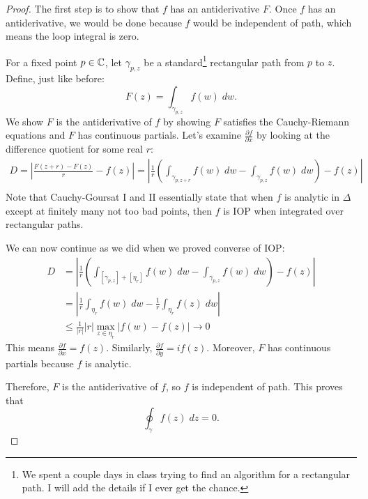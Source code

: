 \documentclass[notes]{subfile}
\begin{document}
\begin{proof}
    The first step is to show that $f$ has an antiderivative $F$.
    Once $f$ has an antiderivative, we would be done
    because $f$ would be independent of path, which means
    the loop integral is zero.

    \noindent
    For a fixed point $p \in \operatorname{\mathbb{C}}$, let $\gamma_{p, z}$ be a standard\footnote{We spent a couple days in class trying to
        find an algorithm for a rectangular path.
        I will add the details if I ever get the chance.
    }
    rectangular path from $p$ to $z$. 
    Define, just like before:
    \[ F(z) = \int_{\gamma_{p, z}} f(w) \; dw .\]
    We show $F$ is the antiderivative of $f$ by showing
    $F$ satisfies the Cauchy-Riemann equations and $F$ 
    has continuous partials.
    Let's examine $\frac{\partial f}{\partial x}$ by 
    looking at the difference quotient for some real $r$:
    \begin{align*}
        D = 
        \left| \frac{F(z+r) - F(z)}{r} - f(z)\right| =
        \left| \frac{1}{r}\left( \int_{\gamma_{p, z+r}} f(w) \; dw - 
        \int_{\gamma_{p, z}} f(w) \; dw \right)  - f(z) \right| \\
    \end{align*}
    Note that Cauchy-Goursat I and II essentially state that
    when $f$ is analytic in $\Delta$ except at finitely many
    not too bad points, then $f$ is IOP when integrated
    over rectangular paths.

    \noindent
    We can now continue as we did when we proved converse of IOP:
    \begin{align*}
        D &= \left| \frac{1}{r}\left( \int_{[\gamma_{p, z}] + [\eta_r]} f(w) \; dw - 
        \int_{\gamma_{p, z}} f(w) \; dw \right)  - f(z) \right| \tag{Independence of Path} \\
        &= \left| \frac{1}{r} \int_{\eta_r} f(w) \; dw - 
        \frac{1}{r} \int_{\eta_r} f(z) \; dw  \right| \tag{Concatenation of Paths} \\
        &\le \frac{1}{|r|} |r| \max_{z \in \eta_r} |f(w) - f(z)|
        \to 0 \tag{ML and Continuity of $f$}
    \end{align*}
    This means $\frac{\partial f}{\partial x} = f(z)$.
    Similarly, $\frac{\partial f}{\partial y} = if(z)$.
    Moreover, $F$ has continuous partials because $f$ is analytic.
    
    \noindent
    Therefore, $F$ is the antiderivative of $f$, so
    $f$ is independent of path.
    This proves that
    \[ \oint_{\gamma} f(z) \; dz = 0. \]
\end{proof}
\end{document}

